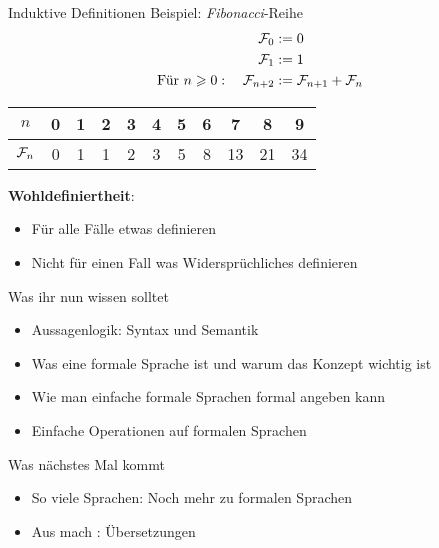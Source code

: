 \newcommand{\Fib}{\mathcal{F}\hspace{-1pt}}

\begin{frame}{Induktive Definitionen}
	Beispiel: \emph{Fibonacci}-Reihe 
	\begin{align*}
	\Fib_{0} &:= 0 \\
	\Fib_1 &:= 1 \\
	\text{Für } n \geq 0: \quad \Fib_{n+2} &:= \Fib_{n+1} + \Fib_n 		
	\end{align*}
	\pause
	\begin{table}
	\centering
	\begin{tabular}{|c|c|c|c|c|c|c|c|c|c|c|}
		\hline
		$n$ & 0 & 1 & 2 & 3 & 4 & 5 & 6 & 7 & 8 & 9 \\ \hline
		$\Fib_n$ & 0 & 1 & 1 & 2 & 3 & 5 & 8 & 13 & 21 & 34 \\ \hline
	\end{tabular}
	\end{table}
	
	\pause
	\textbf{Wohldefiniertheit}: 
	\begin{itemize}
	\item Für alle Fälle etwas definieren 
	\item Nicht für einen Fall was Widersprüchliches definieren
	\end{itemize}
\end{frame}






\begin{frame}	
	\begin{block}{Was ihr nun wissen solltet}
		\begin{itemize}
			\item Aussagenlogik: Syntax und Semantik
			\item Was eine formale Sprache ist und warum das Konzept wichtig ist
			\item Wie man einfache formale Sprachen formal angeben kann
			\item Einfache Operationen auf formalen Sprachen
		\end{itemize}
	\end{block}
	
	\begin{block}{Was nächstes Mal kommt}
		\begin{itemize}
			\item So viele Sprachen: Noch mehr zu formalen Sprachen
			\item Aus  mach : Übersetzungen
		\end{itemize}
	\end{block}
\end{frame}

\slideThanks


